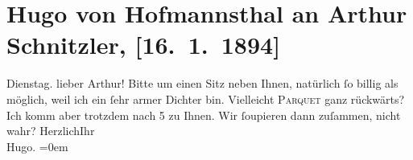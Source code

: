 

         \renewcommand{\erwaehnteOrte}{Orte: Wien}
         \renewcommand{\erwaehnteWerke}{}
               \section[Hugo von Hofmannsthal an Arthur Schnitzler, {[}16. 1. 1894{]}]{ Hugo von Hofmannsthal an Arthur Schnitzler, {[}16. 1. 1894{]}}\nopagebreak{}\rehead{ }\begin{ledgroupsized}[t]{13cm}\normalsize\beginnumbering \toendnotes[C]{\smallbreak\pagebreak[2]} 
\pstart
           \raggedleft{}{\pb}Dienstag.\pend
           \pstart{}lieber Arthur!\pend\pstart
           Bitte um einen Sitz neben Ihnen, natürlich ſo billig als möglich, weil ich ein
                    ſehr armer Dichter bin. Vielleicht \textsc{Parquet} ganz
                    rückwärts? Ich komm aber trotzdem nach 5 zu Ihnen. Wir ſoupieren
                        {\pb}dann zuſammen, nicht
                    wahr?\pend
           \pstart
           Herzlich\hspace*{3.5em}Ihr{\\[\baselineskip]}\spacefill\mbox{Hugo.}\pend
           \leftskip=0em{}
         
         \endnumbering{}\end{ledgroupsized}  \newcommand{\dateiname}{L00293}\newcommand{\titel}{Hugo von Hofmannsthal an Arthur Schnitzler, [16. 1. 1894]}\newcommand{\editorInnen}{Martin Anton Müller und Gerd-Hermann Susen}
      
